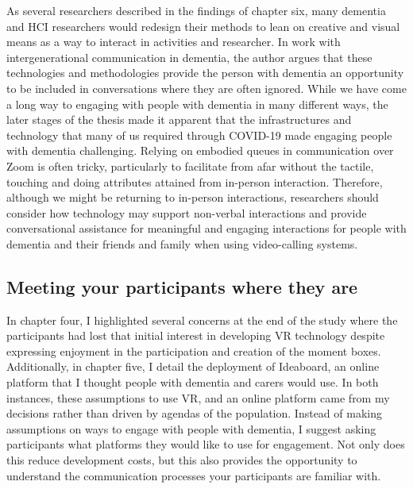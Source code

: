 As several researchers described in the findings of chapter six, many dementia and HCI researchers would redesign their methods to lean on creative and visual means as a way to interact in activities and researcher. In \cite{welsh_ticket_2018} work with intergenerational communication in dementia, the author argues that these technologies and methodologies provide the person with dementia an opportunity to be included in conversations where they are often ignored. While we have come a long way to engaging with people with dementia in many different ways, the later stages of the thesis made it apparent that the infrastructures and technology that many of us required through COVID-19 made engaging people with dementia challenging. Relying on embodied queues in communication over Zoom is often tricky, particularly to facilitate from afar without the tactile, touching and doing attributes attained from in-person interaction. Therefore, although we might be returning to in-person interactions, researchers should consider how technology may support non-verbal interactions and provide conversational assistance for meaningful and engaging interactions for people with dementia and their friends and family when using video-calling systems.

\subsection{Meeting your participants where they are}
\label{Discussion:WhereTheyAre}
In chapter four, I highlighted several concerns at the end of the study where the participants had lost that initial interest in developing VR technology despite expressing enjoyment in the participation and creation of the moment boxes. Additionally, in chapter five, I detail the deployment of Ideaboard, an online platform that I thought people with dementia and carers would use. In both instances, these assumptions to use VR, and an online platform came from my decisions rather than driven by agendas of the population. Instead of making assumptions on ways to engage with people with dementia, I suggest asking participants what platforms they would like to use for engagement. Not only does this reduce development costs, but this also provides the opportunity to understand the communication processes your participants are familiar with. 

